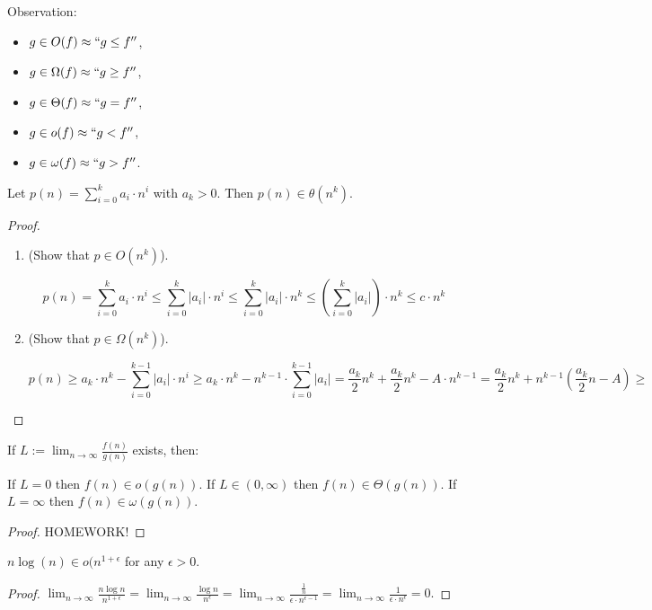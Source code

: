 Observation:
\begin{itemize}
\item $g \in O(f) \approx ``g \le f''$,
\item $g \in \Omega(f) \approx ``g \ge f''$,
\item $g \in \Theta(f) \approx ``g = f''$,
\item $g \in o(f) \approx ``g < f''$,
\item $g \in \omega(f) \approx ``g > f''$.
\end{itemize}

\begin{mylemma}
Let $p(n) = \sum\limits_{i=0}^k a_i \cdot n^i$ with $a_k > 0$. Then $p(n) \in \theta(n^k)$.
\end{mylemma}
\begin{proof}
\begin{enumerate}
\item (Show that $p \in O(n^k)$).

$$p(n) = \sum\limits_{i=0}^k a_i \cdot n^i \le \sum\limits_{i=0}^k |a_i| \cdot n^i
\le \sum\limits_{i=0}^k |a_i| \cdot n^k \le \left ( \sum\limits_{i=0}^k |a_i| \right )\cdot n^k \le c \cdot n^k$$

\item (Show that $p \in \Omega(n^k)$).

$$p(n) \ge a_k \cdot n^k - \sum\limits_{i=0}^{k-1} |a_i| \cdot n^i \ge
a_k \cdot n^k - n^{k-1} \cdot \sum\limits_{i=0}^{k-1} |a_i| =
\frac{a_k}{2} n^k +  \frac{a_k}{2} n^k - A \cdot n^{k-1} = \frac{a_k}{2} n^k + n^{k-1}(\frac{a_k}{2} n - A) \ge $$

\end{enumerate}
\end{proof}

\begin{mylemma}
If $L := \lim_{n \rightarrow \infty} \frac{f(n)}{g(n)}$ exists, then:

If $L = 0$ then $f(n) \in o(g(n))$. If $L \in (0, \infty)$ then $f(n) \in \Theta(g(n))$. If $L = \infty$ then $f(n) \in \omega(g(n))$.
\end{mylemma}
\begin{proof}
{\color{red} HOMEWORK!}
\end{proof}


\begin{mylemma}
$n \log(n) \in o(n^{1+\epsilon}$ for any $\epsilon > 0$.
\end{mylemma}
\begin{proof}
$\lim_{n \rightarrow \infty} \frac{n \log n}{n^{1+\epsilon}} =
\lim_{n \rightarrow \infty} \frac{\log n}{n^{\epsilon}} =
\lim_{n \rightarrow \infty} \frac{\frac{1}{n}}{\epsilon \cdot n^{\epsilon - 1}} =
\lim_{n \rightarrow \infty} \frac{1}{\epsilon \cdot n^{\epsilon}} = 0.$
\end{proof}

